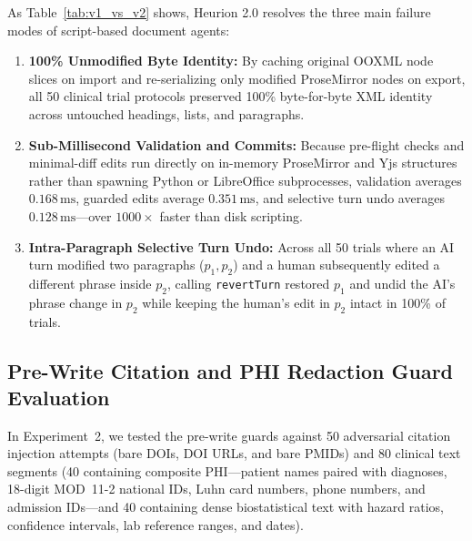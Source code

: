 \documentclass[11pt,a4paper]{article}
\begin{document}
As Table~\ref{tab:v1_vs_v2} shows, Heurion 2.0 resolves the three main failure modes of script-based document agents:
\begin{enumerate}[leftmargin=1.5em,itemsep=2pt]
  \item \textbf{100\% Unmodified Byte Identity:} By caching original OOXML node slices on import and re-serializing only modified ProseMirror nodes on export, all 50 clinical trial protocols preserved 100\% byte-for-byte XML identity across untouched headings, lists, and paragraphs.
  \item \textbf{Sub-Millisecond Validation and Commits:} Because pre-flight checks and minimal-diff edits run directly on in-memory ProseMirror and Yjs structures rather than spawning Python or LibreOffice subprocesses, validation averages $0.168\,\text{ms}$, guarded edits average $0.351\,\text{ms}$, and selective turn undo averages $0.128\,\text{ms}$---over $1000\times$ faster than disk scripting.
  \item \textbf{Intra-Paragraph Selective Turn Undo:} Across all 50 trials where an AI turn modified two paragraphs ($p_1, p_2$) and a human subsequently edited a different phrase inside $p_2$, calling \texttt{revertTurn} restored $p_1$ and undid the AI's phrase change in $p_2$ while keeping the human's edit in $p_2$ intact in 100\% of trials.
\end{enumerate}

\subsection{Pre-Write Citation and PHI Redaction Guard Evaluation}
In Experiment~2, we tested the pre-write guards against 50 adversarial citation injection attempts (bare DOIs, DOI URLs, and bare PMIDs) and 80 clinical text segments (40 containing composite PHI---patient names paired with diagnoses, 18-digit MOD~11-2 national IDs, Luhn card numbers, phone numbers, and admission IDs---and 40 containing dense biostatistical text with hazard ratios, confidence intervals, lab reference ranges, and dates).
\end{document}
